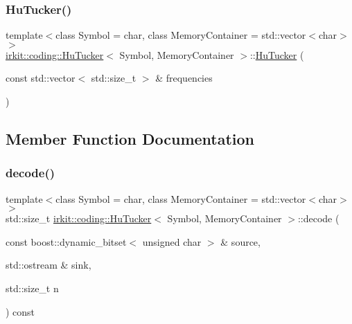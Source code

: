 \subsubsection{\texorpdfstring{Hu\+Tucker()}{HuTucker()}\hspace{0.1cm}{\footnotesize\ttfamily [2/2]}}
{\footnotesize\ttfamily template$<$class Symbol  = char, class Memory\+Container  = std\+::vector$<$char$>$$>$ \\
\mbox{\hyperlink{classirkit_1_1coding_1_1HuTucker}{irkit\+::coding\+::\+Hu\+Tucker}}$<$ Symbol, Memory\+Container $>$\+::\mbox{\hyperlink{classirkit_1_1coding_1_1HuTucker}{Hu\+Tucker}} (\begin{DoxyParamCaption}\item[{const std\+::vector$<$ std\+::size\+\_\+t $>$ \&}]{frequencies }\end{DoxyParamCaption})\hspace{0.3cm}{\ttfamily [inline]}}



\subsection{Member Function Documentation}
\mbox{\label{classirkit_1_1coding_1_1HuTucker_a05dd8e7288464b8e5176d2d07e5a9430}} 
\subsubsection{\texorpdfstring{decode()}{decode()}\hspace{0.1cm}{\footnotesize\ttfamily [1/2]}}
{\footnotesize\ttfamily template$<$class Symbol  = char, class Memory\+Container  = std\+::vector$<$char$>$$>$ \\
std\+::size\+\_\+t \mbox{\hyperlink{classirkit_1_1coding_1_1HuTucker}{irkit\+::coding\+::\+Hu\+Tucker}}$<$ Symbol, Memory\+Container $>$\+::decode (\begin{DoxyParamCaption}\item[{const boost\+::dynamic\+\_\+bitset$<$ unsigned char $>$ \&}]{source,  }\item[{std\+::ostream \&}]{sink,  }\item[{std\+::size\+\_\+t}]{n }\end{DoxyParamCaption}) const\hspace{0.3cm}{\ttfamily [inline]}}

